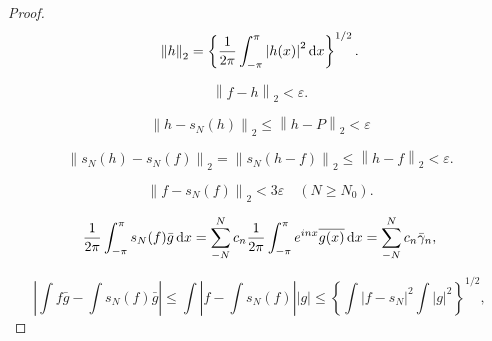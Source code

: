 \begin{proof}
    \begin{equation}
        \label{eq:8.86}
        \left\| h \right\|_2 = 
        \left\{ \frac{1}{2\pi} \int_{-\pi}^{\pi} \left| h(x) \right|^2 \d x 
        \right\}^{1/2} .
    \end{equation}

    \begin{equation}
        \label{eq:8.87}
        \left\| f-h \right\|_2 < \varepsilon .
    \end{equation}

    \begin{equation}
        \label{eq:8.88}
        \left\| h-s_N(h) \right\|_2 \leq
        \left\| h-P \right\|_2 < \varepsilon 
    \end{equation}

    \begin{equation}
        \label{eq:8.89}
        \left\| s_N(h)-s_N(f) \right\|_2 =
        \left\| s_N(h-f) \right\|_2 \leq
        \left\| h-f \right\|_2 < \varepsilon .
    \end{equation}

    \begin{equation}
        \label{eq:8.90}
        \left\| f-s_N(f) \right\|_2 < 3\varepsilon 
        \quad 
        (N \geq N_0) .
    \end{equation}

    \begin{equation}
        \label{eq:8.91}
        \frac{1}{2\pi} \int_{-\pi}^{\pi} s_N(f)\bar{g} \d x =
        \sum_{-N}^{N} c_n \frac{1}{2\pi} \int_{-\pi}^{\pi} e^{inx} \overline{g(x)} \d x =
        \sum_{-N}^{N} c_n \bar{\gamma}_n ,
    \end{equation}

    \begin{equation}
        \label{eq:8.92}
        \left| \int f \bar{g} - \int s_N(f)\bar{g} \right| \leq 
        \int \left| f - \int s_N(f) \right| \left| g \right| \leq
        \left\{ \int \left| f-s_N \right|^2 \int \left| g \right|^2 \right\}^{1/2} ,
    \end{equation}
\end{proof}